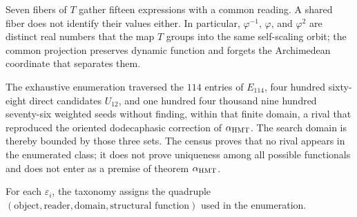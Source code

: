 Seven fibers of \(T\) gather fifteen expressions with a common reading. A
shared fiber does not identify their values either. In particular,
\(\varphi^{-1}\), \(\varphi\), and \(\varphi^2\) are distinct real numbers that the
map \(T\) groups into the same self-scaling orbit; the common
projection preserves dynamic function and forgets the Archimedean coordinate that
separates them.

The exhaustive enumeration traversed the \(114\) entries of \(E_{114}\), four hundred sixty-eight direct candidates \(U_{12}\), and one hundred four thousand nine hundred seventy-six weighted seeds without finding, within that finite domain, a rival that reproduced the oriented dodecaphasic correction of \(\alpha_{\rm HMT}\). The search domain is thereby bounded by those three sets. The census proves that no rival appears in the enumerated class; it does not prove uniqueness among all possible functionals and does not enter as a premise of theorem \(\alpha_{\rm HMT}\).

For each \(\varepsilon_i\), the taxonomy assigns the quadruple
\((\text{object},\text{reader},\text{domain},\text{structural function})\)
used in the enumeration.
